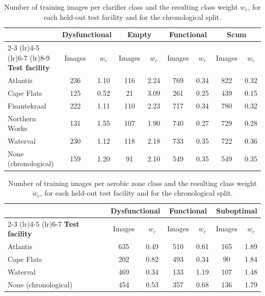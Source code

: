 \begin{table}[htbp]
\centering
\caption{Number of training images per clarifier class and the resulting class weight $w_c$, for each held-out test facility and for the chronological split.}
\label{tab:class_weights}
\setlength{\tabcolsep}{4pt}
\begin{tabular}{l cc cc cc cc}
\toprule
& \multicolumn{2}{c}{\textbf{Dysfunctional}} & \multicolumn{2}{c}{\textbf{Empty}} & \multicolumn{2}{c}{\textbf{Functional}} & \multicolumn{2}{c}{\textbf{Scum}} \\
\cmidrule(lr){2-3} \cmidrule(lr){4-5} \cmidrule(lr){6-7} \cmidrule(lr){8-9}
\textbf{Test facility} & Images & $w_c$ & Images & $w_c$ & Images & $w_c$ & Images & $w_c$ \\
\midrule
Atlantis       & 236 & 1.10 & 116 & 2.24 & 769 & 0.34 & 822 & 0.32 \\
Cape Flats     & 125 & 0.52 & 21  & 3.09 & 261 & 0.25 & 439 & 0.15 \\
Fisantekraal   & 222 & 1.11 & 110 & 2.23 & 717 & 0.34 & 780 & 0.32 \\
Northern Works & 131 & 1.55 & 107 & 1.90 & 740 & 0.27 & 729 & 0.28 \\
Waterval       & 230 & 1.12 & 118 & 2.18 & 733 & 0.35 & 722 & 0.36 \\
\midrule
None (chronological) & 159 & 1.20 & 91 & 2.10 & 549 & 0.35 & 549 & 0.35 \\
\bottomrule
\end{tabular}
\end{table}

\begin{table}[htbp]
\centering
\caption{Number of training images per aerobic zone class and the resulting class weight $w_c$, for each held-out test facility and for the chronological split.}
\label{tab:class_weights_aerobic}
\begin{tabular}{l cc cc cc}
\toprule
& \multicolumn{2}{c}{\textbf{Dysfunctional}} & \multicolumn{2}{c}{\textbf{Functional}} & \multicolumn{2}{c}{\textbf{Suboptimal}} \\
\cmidrule(lr){2-3} \cmidrule(lr){4-5} \cmidrule(lr){6-7}
\textbf{Test facility} & Images & $w_c$ & Images & $w_c$ & Images & $w_c$ \\
\midrule
Atlantis          & 635 & 0.49 & 510 & 0.61 & 165 & 1.89 \\
Cape Flats        & 202 & 0.82 & 493 & 0.34 & 90  & 1.84 \\
Waterval          & 469 & 0.34 & 133 & 1.19 & 107 & 1.48 \\
\midrule
None (chronological) & 454 & 0.53 & 357 & 0.68 & 136 & 1.79 \\
\bottomrule
\end{tabular}
\end{table}


